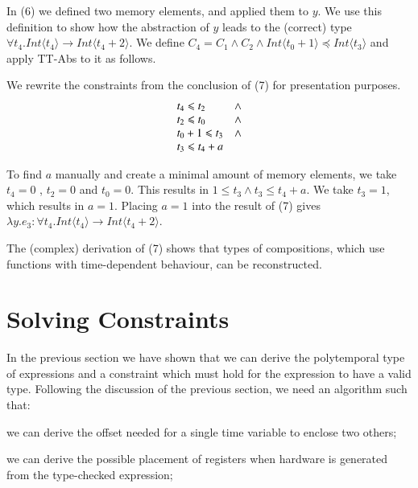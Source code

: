 In {\scriptsize (6)} we defined two memory elements, and applied them to $y$.
We use this definition to show how the abstraction of $y$ leads to the (correct) type $\forall t_4. \textit{Int}\langle t_4 \rangle \to \textit{Int} \langle t_4 + 2 \rangle$.
We define $C_4 = C_1 \land C_2 \land \textit{Int}\langle t_0 + 1 \rangle \preceq \textit{Int}\langle t_3 \rangle$ and apply TT-Abs to it as follows.

\begin{prooftree}
\end{prooftree}

We rewrite the constraints from the conclusion of {\scriptsize (7)} for presentation purposes.
\[
\begin{array}{l l}
t_4 \leq t_2 & \land \\
t_2 \leq t_0 & \land \\
t_0 + 1 \leq t_3 & \land \\
t_3 \leq t_4 + a \\
\end{array}
\]

To find $a$ manually and create a minimal amount of memory elements, we take $t_4=0$ , $t_2=0$ and $t_0=0$.
This results in $1 \leq t_3 \land t_3 \leq t_4 + a$.
We take $t_3=1$, which results in $a=1$.
Placing $a=1$ into the result of {\scriptsize (7)} gives $\lambda y.e_3 : \forall t_4. \textit{Int}\langle t_4 \rangle \to \textit{Int} \langle t_4 + 2 \rangle$.

The (complex) derivation of {\scriptsize (7)} shows that types of compositions, which use functions with time-dependent behaviour, can be reconstructed.

\section{Solving Constraints}
In the previous section we have shown that we can derive the polytemporal type of expressions and a constraint which must hold for the expression to have a valid type.
Following the discussion of the previous section, we need an algorithm such that:
\begin{enumerate*}
 \item we can derive the offset needed for a single time variable to enclose two others;
 \item we can derive the possible placement of registers when hardware is generated from the type-checked expression;
\end{enumerate*}

